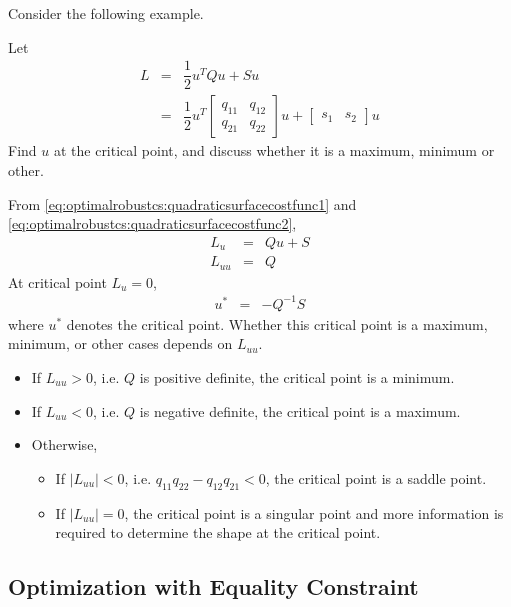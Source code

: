 Consider the following example.
\begin{shortbox}

Let
\begin{eqnarray}
	L &=& \dfrac{1}{2}u^TQu + Su \label{eq:optimalrobustcs:quadraticsurfacecostfunc1} \\
	&=& \dfrac{1}{2}u^T\left[\begin{array}{cc}
		q_{11} & q_{12} \\
		q_{21} & q_{22}
	\end{array}\right]u + \left[\begin{array}{cc}
	s_1 & s_2
	\end{array}\right]u \label{eq:optimalrobustcs:quadraticsurfacecostfunc2}
\end{eqnarray}
Find $u$ at the critical point, and discuss whether it is a maximum, minimum or other.

\end{shortbox}

From \eqref{eq:optimalrobustcs:quadraticsurfacecostfunc1} and \eqref{eq:optimalrobustcs:quadraticsurfacecostfunc2},
\begin{eqnarray}
	L_u &=& Qu + S \nonumber \\
	L_{uu} &=& Q \nonumber
\end{eqnarray}
At critical point $L_u=0$,
\begin{eqnarray}
	u^* &=& -Q^{-1}S \nonumber
\end{eqnarray}
where $u^*$ denotes the critical point. Whether this critical point is a maximum, minimum, or other cases depends on $L_{uu}$.
\begin{itemize}
	\item If $L_{uu}>0$, i.e. $Q$ is positive definite, the critical point is a minimum.
	\item If $L_{uu}<0$, i.e. $Q$ is negative definite, the critical point is a maximum.
	\item Otherwise, \begin{itemize}
		\item If $|L_{uu}|<0$, i.e. $q_{11}q_{22}-q_{12}q_{21}<0$, the critical point is a saddle point.
		\item If $|L_{uu}|=0$, the critical point is a singular point and more information is required to determine the shape at the critical point.
	\end{itemize}
\end{itemize}

\subsection{Optimization with Equality Constraint}

